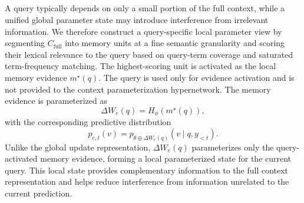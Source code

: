 \subsection{\qame{}}
\label{sec:memory_evidence_activation}

A query typically depends on only a small portion of the full context, while a unified global parameter state may introduce interference from irrelevant information. We therefore construct a query-specific local parameter view by segmenting $C_{\mathrm{full}}$ into memory units at a fine semantic granularity and scoring their lexical relevance to the query based on query-term coverage and saturated term-frequency matching. The highest-scoring unit is activated as the local memory evidence $m^\star(q)$. The query is used only for evidence activation and is not provided to the context parameterization hypernetwork. The memory evidence is parameterized as
\begin{equation}
\Delta W_e(q)=H_\phi\left(m^\star(q)\right),
\label{eq:evidence_adapter}
\end{equation}
with the corresponding predictive distribution
\begin{equation}
p_{e,t}(v) = p_{\theta\oplus\Delta W_e(q)} \left(v\mid q,y_{<t}\right).
\label{eq:evidence-distribution}
\end{equation}
Unlike the global update representation, $\Delta W_e(q)$ parameterizes only the query-activated memory evidence, forming a local parameterized state for the current query. This local state provides complementary information to the full context representation and helps reduce interference from information unrelated to the current prediction.






